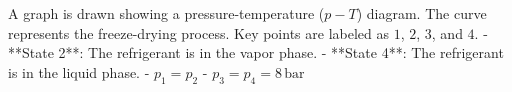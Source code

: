 A graph is drawn showing a pressure-temperature (\(p-T\)) diagram. The curve represents the freeze-drying process. Key points are labeled as \(1\), \(2\), \(3\), and \(4\).  
- **State 2**: The refrigerant is in the vapor phase.  
- **State 4**: The refrigerant is in the liquid phase.  
- \(p_1 = p_2\)  
- \(p_3 = p_4 = 8 \, \text{bar}\)
